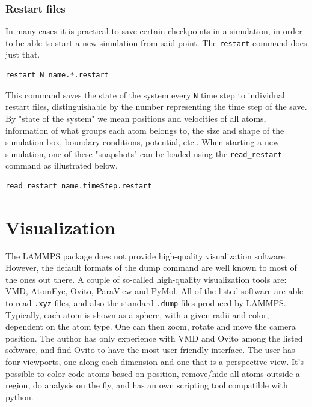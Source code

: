 \documentclass[twoside,english]{uiofysmaster}
\begin{document}
\subsubsection{Restart files}
In many cases it is practical to save certain checkpoints in a simulation, in order to be able to start a new simulation from said point. 
The \texttt{restart} command does just that. 
\begin{lstlisting}[language=LammpsInput]
restart N name.*.restart
\end{lstlisting} 
This command saves the state of the system every \texttt{N} time step to individual restart files, distinguishable by the number representing the time step of the save. 
By "state of the system" we mean positions and velocities of all atoms, information of what groups each atom belongs to, the size and shape of the simulation box, boundary conditions, potential,  etc.. 
When starting a new simulation, one of these "snapshots" can be loaded using the \texttt{read\_restart} command as illustrated below.
\begin{lstlisting}[language=LammpsInput]
read_restart name.timeStep.restart
\end{lstlisting} 



\section{Visualization}
The LAMMPS package does not provide high-quality visualization software. However, the default formats of the dump command are well known to most of the ones out there. 
A couple of so-called high-quality visualization tools are: VMD, AtomEye, Ovito, ParaView and PyMol.
All of the listed software are able to read \texttt{.xyz}-files, and also the standard \texttt{.dump}-files produced by LAMMPS.
Typically, each atom is shown as a sphere, with a given radii and color, dependent on the atom type.
One can then zoom, rotate and move the camera position. 
The author has only experience with VMD and Ovito among the listed software, and find Ovito to have the most user friendly interface.
The user has four viewports, one along each dimension and one that is a perspective view.
It's possible to color code atoms based on position, remove/hide all atoms outside a region, do analysis on the fly, and has an own scripting tool compatible with python. 
\end{document}
